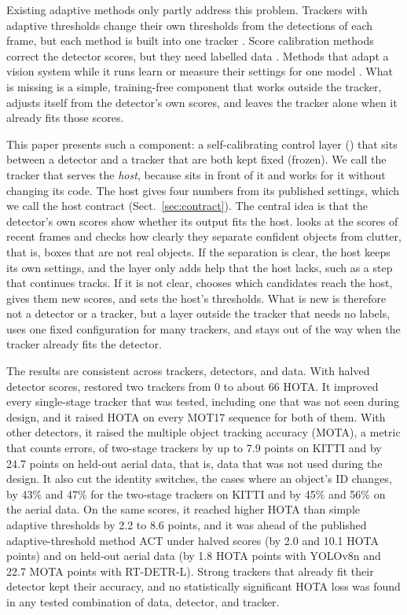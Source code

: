 Existing adaptive methods only partly address this problem. Trackers with adaptive thresholds
change their own thresholds from the detections of each frame, but each method is built into one
tracker \cite{ma2023adaptivebytetrack,shim2024adaptrack,act2026adaptive}. Score calibration methods
correct the detector scores, but they need labelled data \cite{kuppers2020detcalib}. Methods that
adapt a vision system while it runs learn or measure their settings for one model
\cite{han2022dynamic,jiang2018chameleon}. What is missing is a simple, training-free component that
works outside the tracker, adjusts itself from the detector's own scores, and leaves the tracker
alone when it already fits those scores.

This paper presents such a component: a self-calibrating control layer (\scl{}) that sits between
a detector and a tracker that are both kept fixed (frozen). We call the tracker that \scl{} serves
the \emph{host}, because \scl{} sits in front of it and works for it without changing its code. The
host gives \scl{} four numbers from its published settings, which we call the host contract
(Sect.~\ref{sec:contract}). The central idea is that the detector's own scores show whether its
output fits the host. \scl{} looks at the scores of recent frames and checks how clearly they
separate confident objects from clutter, that is, boxes that are not real objects. If the
separation is clear, the host keeps its own settings, and the layer only adds help that the host
lacks, such as a step that continues tracks. If it is not clear, \scl{} chooses which candidates
reach the host, gives them new scores, and sets the host's thresholds. What is new is therefore not
a detector or a tracker, but a layer outside the tracker that needs no labels, uses one fixed
configuration for many trackers, and stays out of the way when the tracker already fits the
detector.



The results are consistent across trackers, detectors, and data. With halved detector scores,
\scl{} restored two trackers from 0 to about 66 HOTA. It improved every single-stage tracker that
was tested, including one that was not seen during design, and it raised HOTA on every MOT17
sequence for both of them. With other detectors, it raised the multiple object tracking accuracy
(MOTA), a metric that counts errors, of two-stage trackers by up to 7.9 points on KITTI and by 24.7
points on held-out aerial data, that is, data that was not used during the design. It also cut the
identity switches, the cases where an object's ID changes, by 43\% and 47\% for the two-stage
trackers on KITTI and by 45\% and 56\% on the aerial data. On the same scores, it reached higher
HOTA than simple adaptive thresholds by 2.2 to 8.6 points, and it was ahead of the published
adaptive-threshold method ACT under halved scores (by 2.0 and 10.1 HOTA points) and on held-out
aerial data (by 1.8 HOTA points with YOLOv8n and 22.7 MOTA points with RT-DETR-L). Strong trackers
that already fit their detector kept their accuracy, and no statistically significant HOTA loss was
found in any tested combination of data, detector, and tracker.

